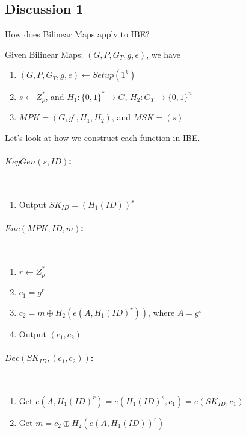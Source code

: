 \subsection{Discussion 1}
How does Bilinear Maps apply to IBE?

Given Bilinear Maps: $(G, P, G_T, g, e)$, we have

\begin{enumerate}
\item $(G, P, G_T, g, e) \gets Setup(1^k)$
\item $s \gets Z^*_p$, and $H_1: \{0, 1\}^* \to G $, $H_2: G_T \to \{0, 1\}^n$
\item $MPK = (G, g^s, H_1, H_2)$, and $MSK = (s)$
\end{enumerate}

Let's look at how we construct each function in IBE.

\paragraph{$KeyGen(s, ID)$:}~\\
\begin{enumerate}
\item Output $SK_{ID} = (H_1(ID))^s$
\end{enumerate}

\paragraph{$Enc(MPK, ID, m)$:}~\\
\begin{enumerate}
\item $r \gets Z^*_p$
\item $c_1 = g^r$
\item $c_2 = m \oplus H_2(e(A, H_1(ID)^r))$, where $A = g^s$
\item Output $(c_1, c_2)$
\end{enumerate}

\paragraph{$Dec(SK_{ID}, (c_1, c_2))$:}~\\
\begin{enumerate}
\item Get $e(A, H_1(ID)^r) = e(H_1(ID)^s, c_1) = e(SK_{ID}, c_1)$
\item Get $m = c_2 \oplus H_2(e(A, H_1(ID))^r)$
\end{enumerate}

